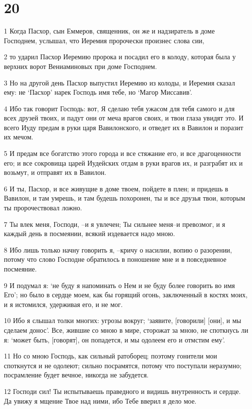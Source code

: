 \chapter{20}

\par 1 Когда Пасхор, сын Еммеров, священник, он же и надзиратель в доме Господнем, услышал, что Иеремия пророчески произнес слова сии,
\par 2 то ударил Пасхор Иеремию пророка и посадил его в колоду, которая была у верхних ворот Вениаминовых при доме Господнем.
\par 3 Но на другой день Пасхор выпустил Иеремию из колоды, и Иеремия сказал ему: не `Пасхор' нарек Господь имя тебе, но `Магор Миссавив'.
\par 4 Ибо так говорит Господь: вот, Я сделаю тебя ужасом для тебя самого и для всех друзей твоих, и падут они от меча врагов своих, и твои глаза увидят это. И всего Иуду предам в руки царя Вавилонского, и отведет их в Вавилон и поразит их мечом.
\par 5 И предам все богатство этого города и все стяжание его, и все драгоценности его; и все сокровища царей Иудейских отдам в руки врагов их, и разграбят их и возьмут, и отправят их в Вавилон.
\par 6 И ты, Пасхор, и все живущие в доме твоем, пойдете в плен; и придешь в Вавилон, и там умрешь, и там будешь похоронен, ты и все друзья твои, которым ты пророчествовал ложно.
\par 7 Ты влек меня, Господи, --и я увлечен; Ты сильнее меня--и превозмог, и я каждый день в посмеянии, всякий издевается надо мною.
\par 8 Ибо лишь только начну говорить я, --кричу о насилии, вопию о разорении, потому что слово Господне обратилось в поношение мне и в повседневное посмеяние.
\par 9 И подумал я: `не буду я напоминать о Нем и не буду более говорить во имя Его'; но было в сердце моем, как бы горящий огонь, заключенный в костях моих, и я истомился, удерживая его, и не мог.
\par 10 Ибо я слышал толки многих: угрозы вокруг; `заявите, [говорили] [они], и мы сделаем донос'. Все, жившие со мною в мире, сторожат за мною, не споткнусь ли я: `может быть, [говорят], он попадется, и мы одолеем его и отмстим ему'.
\par 11 Но со мною Господь, как сильный ратоборец; поэтому гонители мои споткнутся и не одолеют; сильно посрамятся, потому что поступали неразумно; посрамление будет вечное, никогда не забудется.
\par 12 Господи сил! Ты испытываешь праведного и видишь внутренность и сердце. Да увижу я мщение Твое над ними, ибо Тебе вверил я дело мое.
